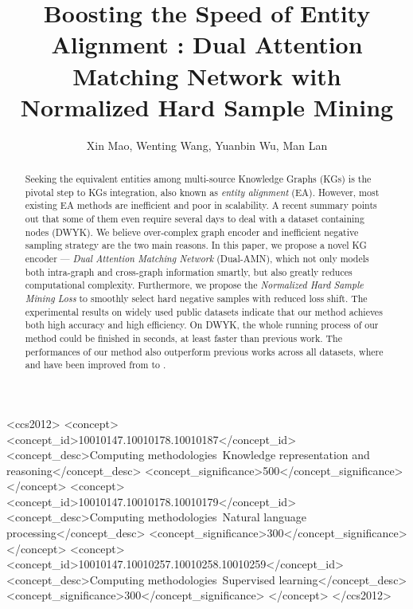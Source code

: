 \documentclass[sigconf]{acmart}
\begin{document}
\title{Boosting the Speed of Entity Alignment \textbf{}: Dual Attention Matching Network with Normalized Hard Sample Mining}

\author{Xin Mao, Wenting Wang, Yuanbin Wu, Man Lan}

\begin{abstract}
Seeking the equivalent entities among multi-source Knowledge Graphs (KGs) is the pivotal step to KGs integration, also known as \emph{entity alignment} (EA).
However, most existing EA methods are inefficient and poor in scalability.
A recent summary points out that some of them even require several days to deal with a dataset containing  nodes (DWYK).
We believe over-complex graph encoder and inefficient negative sampling strategy are the two main reasons.
In this paper, we propose a novel KG encoder --- \emph{Dual Attention Matching Network} (Dual-AMN), which not only models both intra-graph and cross-graph information smartly, but also greatly reduces computational complexity.
Furthermore, we propose the \emph{Normalized Hard Sample Mining Loss} to smoothly select hard negative samples with reduced loss shift.
The experimental results on widely used public datasets indicate that our method achieves both high accuracy and high efficiency.
On DWYK, the whole running process of our method could be finished in  seconds, at least  faster than previous work.
The performances of our method also outperform previous works across all datasets, where  and  have been improved from  to .
\end{abstract}

\begin{CCSXML}
<ccs2012>
<concept>
<concept_id>10010147.10010178.10010187</concept_id>
<concept_desc>Computing methodologies~Knowledge representation and reasoning</concept_desc>
<concept_significance>500</concept_significance>
</concept>
<concept>
<concept_id>10010147.10010178.10010179</concept_id>
<concept_desc>Computing methodologies~Natural language processing</concept_desc>
<concept_significance>300</concept_significance>
</concept>
<concept>
<concept_id>10010147.10010257.10010258.10010259</concept_id>
<concept_desc>Computing methodologies~Supervised learning</concept_desc>
<concept_significance>300</concept_significance>
</concept>
</ccs2012>
\end{CCSXML}

\end{document}

